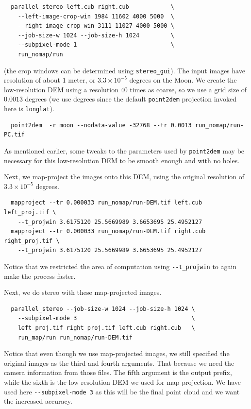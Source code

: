 \begin{verbatim}
  parallel_stereo left.cub right.cub            \
    --left-image-crop-win 1984 11602 4000 5000  \
    --right-image-crop-win 3111 11027 4000 5000 \
    --job-size-w 1024 --job-size-h 1024         \
    --subpixel-mode 1                           \
    run_nomap/run
\end{verbatim}

(the crop windows can be determined using \texttt{stereo\_gui}). 
The input images have resolution of about 1 meter, or $3.3 \times
10^{-5}$ degrees on the Moon. We create the low-resolution DEM using a
resolution 40 times as coarse, so we use a grid size of $0.0013$ degrees
(we use degrees since the default \texttt{point2dem} projection invoked
here is \texttt{longlat}).

\begin{verbatim}
  point2dem  -r moon --nodata-value -32768 --tr 0.0013 run_nomap/run-PC.tif
\end{verbatim}

As mentioned earlier, some tweaks to the parameters used by \texttt{point2dem}
may be necessary for this low-resolution DEM to be smooth enough and
with no holes.

Next, we map-project the images onto this DEM, using the original resolution
of $3.3 \times 10^{-5}$ degrees.

\begin{verbatim}
  mapproject --tr 0.000033 run_nomap/run-DEM.tif left.cub left_proj.tif \
    --t_projwin 3.6175120 25.5669989 3.6653695 25.4952127
  mapproject --tr 0.000033 run_nomap/run-DEM.tif right.cub right_proj.tif \
    --t_projwin 3.6175120 25.5669989 3.6653695 25.4952127
\end{verbatim}

Notice that we restricted the area of computation using \texttt{-\/-t\_projwin}
to again make the process faster.

Next, we do stereo with these map-projected images.

\begin{verbatim}
  parallel_stereo --job-size-w 1024 --job-size-h 1024 \
    --subpixel-mode 3                                 \
    left_proj.tif right_proj.tif left.cub right.cub   \
    run_map/run run_nomap/run-DEM.tif
\end{verbatim}

Notice that even though we use map-projected images, we still specified
the original images as the third and fourth arguments. That because we
need the camera information from those files.  The fifth argument is
the output prefix, while the sixth is the low-resolution DEM we used for
map-projection. We have used here \texttt{-\/-subpixel-mode 3} as this
will be the final point cloud and we want the increased accuracy.

